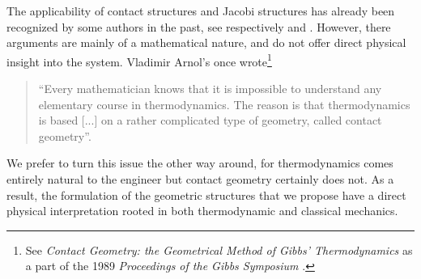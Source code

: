 The applicability of contact structures and Jacobi structures has already been recognized by some authors in the past, see respectively \citet{Bravetti2017} and \citet{ciaglia2018}. However, there arguments are mainly of a mathematical nature, and do not offer direct physical insight into the system. Vladimir Arnol's once wrote\footnote{See \emph{Contact Geometry: the Geometrical Method of Gibbs' Thermodynamics} as a part of the 1989 \emph{Proceedings of the Gibbs Symposium} \cite[p. 163]{Arnold1989b}.}
\begin{quote}
``Every mathematician knows that it is impossible to understand any elementary course in thermodynamics. The reason is that thermodynamics is based [...] on a rather complicated type of geometry, called contact geometry''.
\end{quote}
We prefer to turn this issue the other way around, for thermodynamics comes entirely natural to the engineer but contact geometry certainly does not. As a result, the formulation of the geometric structures that we propose have a direct physical interpretation rooted in both thermodynamic and classical mechanics.




